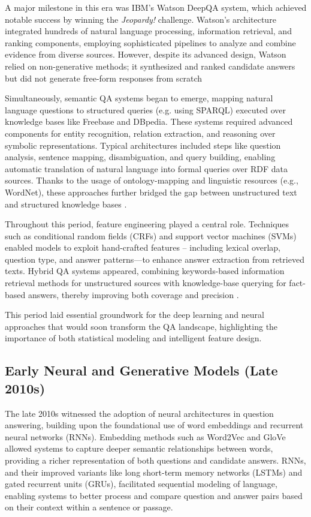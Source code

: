 \begin{spacing}{1.5}
A major milestone in this era was IBM's Watson DeepQA system, \citep{noauthor_ibm_2025} which achieved notable success by winning the \textit{Jeopardy!} challenge. Watson’s architecture integrated hundreds of natural language processing, information retrieval, and ranking components, employing sophisticated pipelines to analyze and combine evidence from diverse sources. However, despite its advanced design, Watson relied on non-generative methods; it synthesized and ranked candidate answers but did not generate free-form responses from scratch

Simultaneously, semantic QA systems began to emerge, mapping natural language questions to structured queries (e.g. using SPARQL) executed over knowledge bases like Freebase and DBpedia. These systems required advanced components for entity recognition, relation extraction, and reasoning over symbolic representations. Typical architectures included steps like question analysis, sentence mapping, disambiguation, and query building, enabling automatic translation of natural language into formal queries over RDF data sources. Thanks to the usage of ontology-mapping and linguistic resources (e.g., WordNet), these approaches further bridged the gap between unstructured text and structured knowledge bases \citep{franco_ontology-based_2020}.

Throughout this period, feature engineering played a central role. Techniques such as conditional random fields (CRFs) and support vector machines (SVMs) enabled models to exploit hand-crafted features -- including lexical overlap, question type, and answer patterns—to enhance answer extraction from retrieved texts. Hybrid QA systems appeared, combining keywords-based information retrieval methods for unstructured sources with knowledge-base querying for fact-based answers, thereby improving both coverage and precision \citep{antoniou_survey_2022}.

This period laid essential groundwork for the deep learning and neural approaches that would soon transform the QA landscape, highlighting the importance of both statistical modeling and intelligent feature design.

\subsection{Early Neural and Generative Models (Late 2010s)}
The late 2010s witnessed the adoption of neural architectures in question answering, building upon the foundational use of word embeddings and recurrent neural networks (RNNs). Embedding methods such as Word2Vec and GloVe allowed systems to capture deeper semantic relationships between words, providing a richer representation of both questions and candidate answers. RNNs, and their improved variants like long short-term memory networks (LSTMs) and gated recurrent units (GRUs), facilitated sequential modeling of language, enabling systems to better process and compare question and answer pairs based on their context within a sentence or passage.


\end{spacing}

